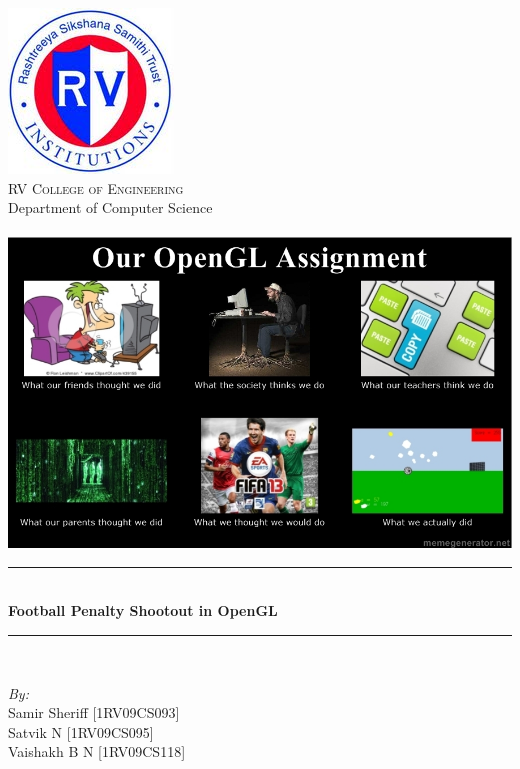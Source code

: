 \documentclass[12pt]{article} %
\date{}
\title{}
\newcommand{\HRule}{\rule{\linewidth}{0.5mm}}
\begin{document}
\maketitle
\begin{titlepage}

\begin{center}


\includegraphics[scale=0.5]{RVCE.png}\\[1cm]    

\textsc{\LARGE  RV College of Engineering}\\[0.5cm]
\large{Department of Computer Science}\\[1cm]
\textsc{\Large }\\[0.5cm]

\includegraphics[scale=0.9]{whatwedid.png}\\[1cm]    

\HRule \\[0.4cm]
{  \huge\bfseries Football Penalty Shootout in OpenGL }\\[0.4cm]

\HRule \\[1cm]

\begin{minipage}{0.8\textwidth}
\begin{flushleft} \large
\emph{By:}\\
Samir Sheriff [1RV09CS093]\\
Satvik \textsc{N} [1RV09CS095]\\
Vaishakh \textsc{B N} [1RV09CS118]\\

\end{flushleft}
\end{minipage}
\vfill
\date{}
{\large}

\end{center}

\end{titlepage}
\end{document}
